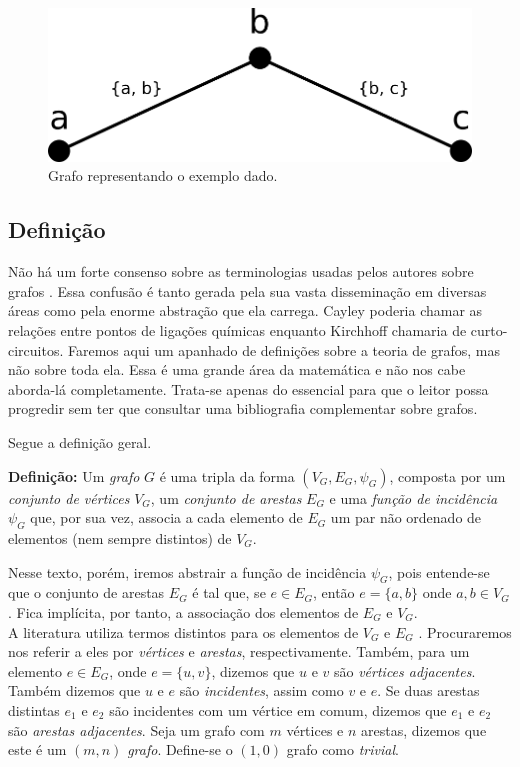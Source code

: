 \documentclass[a4paper,12pt]{article}
\begin{document}
\begin{figure}[H]
	\begin{center}
		\includegraphics[width=0.35\linewidth]{socialGraph.png}
	\end{center}
	\caption{Grafo representando o exemplo dado.}
	\label{fig:socialGraph}
\end{figure}

\subsection{Definição}

Não há um forte consenso sobre as terminologias usadas pelos autores sobre grafos \cite{graphTheoryFHarary}. Essa confusão é tanto gerada pela sua vasta disseminação em diversas áreas como pela enorme abstração que ela carrega. Cayley poderia chamar as relações entre pontos de ligações químicas enquanto Kirchhoff chamaria de curto-circuitos.
Faremos aqui um apanhado de definições sobre a teoria de grafos, mas não sobre toda ela. Essa é uma grande área da matemática e não nos cabe aborda-lá completamente. Trata-se apenas do essencial para que o leitor possa progredir sem ter que consultar uma bibliografia complementar sobre grafos.

Segue a definição geral.

\begin{center}
	\begin{minipage}{0.9 \linewidth}
		\textbf{Definição:} Um \textit{grafo} $G$ é uma tripla da forma $(V_G,E_G, \psi_{G})$, composta por um \textit{conjunto de vértices} $V_G$, um \textit{conjunto de arestas} $E_G$ e uma \textit{função de incidência} $\psi_{G}$ que, por sua vez, associa a cada elemento de $E_G$ um par não ordenado de elementos (nem sempre distintos) de $V_G$.
	\end{minipage}
\end{center} 

Nesse texto, porém, iremos abstrair a função de incidência $\psi_G$, pois entende-se que o conjunto de arestas $E_G$ é tal que, se $e \in E_G$, então $e = \{a, b\}$ onde $a, b \in V_G$. Fica implícita, por tanto, a associação dos elementos de  $E_G$ e $V_G$.
\\

A literatura utiliza termos distintos para os elementos de $V_G$ e $E_G$ \cite{graphTheoryFHarary}. Procuraremos nos referir a eles por \textit{vértices} e \textit{arestas}, respectivamente. Também, para um elemento $e \in E_G$, onde $e = \{u, v\}$, dizemos que $u$ e $v$ são \textit{vértices adjacentes}. Também dizemos que $u$ e $e$ são \textit{incidentes}, assim como $v$ e $e$. Se duas arestas distintas $e_1$ e $e_2$ são incidentes com um vértice em comum, dizemos que $e_1$ e $e_2$ são \textit{arestas adjacentes}. Seja um grafo com $m$ vértices e $n$ arestas, dizemos que este é um $(m, n)$ \textit{grafo}. Define-se o $(1,0)$ grafo como \textit{trivial}.
\end{document}
